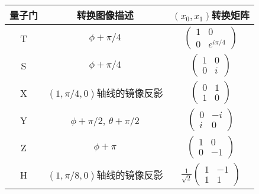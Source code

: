 \label{t-gates}
\begin{tabular}{|c|c|c|}
\hline
量子门 & 转换图像描述 & $(x_0, x_1)$转换矩阵 \\
\hline
T & $\phi + \pi/4$ & $
\begin{pmatrix}
    1 & 0 \\
    0 & e^{i \pi/4}
\end{pmatrix} $ \\
\hline
S & $\phi + \pi/4$ & $
\begin{pmatrix}
    1 & 0 \\
    0 & i 
\end{pmatrix} $ \\
\hline
X & $(1, \pi/4, 0)$轴线的镜像反影 & $
\begin{pmatrix}
    0 & 1 \\
    1 & 0
\end{pmatrix} $ \\
\hline
Y & $\phi + \pi/2$, $\theta + \pi/2$ & $
\begin{pmatrix}
    0 & -i \\
    i & 0
\end{pmatrix} $ \\
\hline
Z & $\phi + \pi$ & $
\begin{pmatrix}
    1 & 0 \\
    0 & -1
\end{pmatrix} $ \\
\hline
H & $(1, \pi/8, 0)$轴线的镜像反影  & $
\frac 1 {\sqrt 2}
\begin{pmatrix}
    1 & -1 \\
    1 & 1
\end{pmatrix} $ \\
\hline

\end{tabular}

